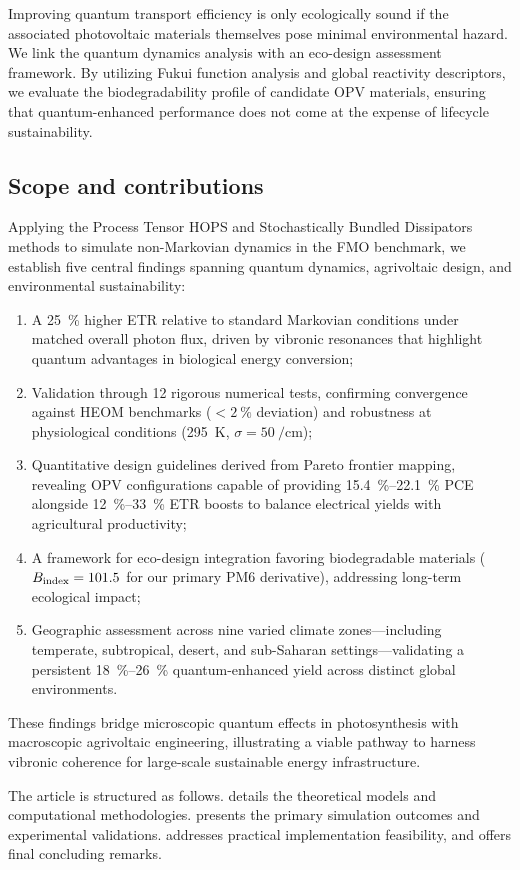 Improving quantum transport efficiency is only ecologically sound if the associated photovoltaic materials themselves pose minimal environmental hazard. We link the quantum dynamics analysis with an eco-design assessment framework. By utilizing Fukui function analysis and global reactivity descriptors, we evaluate the biodegradability profile of candidate OPV materials, ensuring that quantum-enhanced performance does not come at the expense of lifecycle sustainability.

\subsection{Scope and contributions}

Applying the Process Tensor HOPS and Stochastically Bundled Dissipators methods to simulate non-Markovian dynamics in the FMO benchmark, we establish five central findings spanning quantum dynamics, agrivoltaic design, and environmental sustainability:

\begin{enumerate}
\item A \SI{25}{\percent} higher ETR relative to standard Markovian conditions under matched overall photon flux, driven by vibronic resonances that highlight quantum advantages in biological energy conversion;

\item Validation through 12 rigorous numerical tests, confirming convergence against HEOM benchmarks ($< \SI{2}{\percent}$ deviation) and robustness at physiological conditions (\SI{295}{\kelvin}, $\sigma = \SI{50}{\per\cm}$);

\item Quantitative design guidelines derived from Pareto frontier mapping, revealing OPV configurations capable of providing \SIrange{15.4}{22.1}{\percent} PCE alongside \SIrange{12}{33}{\percent} ETR boosts to balance electrical yields with agricultural productivity;

\item A framework for eco-design integration favoring biodegradable materials ($B_{\rm index} = 101.5$ for our primary PM6 derivative), addressing long-term ecological impact;

\item Geographic assessment across nine varied climate zones---including temperate, subtropical, desert, and sub-Saharan settings---validating a persistent \SIrange{18}{26}{\percent} quantum-enhanced yield across distinct global environments.
\end{enumerate}

These findings bridge microscopic quantum effects in photosynthesis with macroscopic agrivoltaic engineering, illustrating a viable pathway to harness vibronic coherence for large-scale sustainable energy infrastructure.

The article is structured as follows.  details the theoretical models and computational methodologies.  presents the primary simulation outcomes and experimental validations.  addresses practical implementation feasibility, and  offers final concluding remarks.
